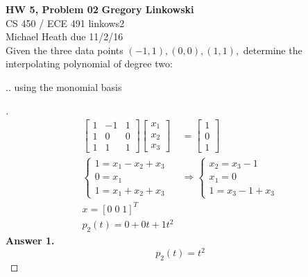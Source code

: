 \documentclass[12pt]{article}
\newenvironment{exercise}[2][Exercise]{\begin{trivlist}
\item[\hskip \labelsep {\bfseries #1}\hskip \labelsep {\bfseries #2.}]}{\end{trivlist}}
\begin{document}
\noindent
\large\textbf{HW 5, Problem 02} \hfill \textbf{Gregory Linkowski} \\
\normalsize CS 450 / ECE 491 \hfill linkows2 \\
Michael Heath \hfill due 11/2/16 \\


\vspace{5mm}
Given the three data points $(-1,1), (0,0), (1,1),$ determine the interpolating polynomial of degree two:
\vspace{-2mm} \\

\begin{exercise}{1}
	... using the monomial basis
\end{exercise} \vspace{-10mm}
\begin{proof}[]
	\begin{align*}
		\begin{bmatrix}	1 & -1 & 1 \\ 1 & 0 & 0 \\ 1 & 1 & 1	\end{bmatrix}
			\begin{bmatrix}	x_1 \\ x_2 \\ x_3 \end{bmatrix}
			&= \begin{bmatrix} 1 \\ 0 \\ 1	\end{bmatrix} \\[10pt]
		\begin{cases}
			1 = x_1 - x_2 + x_3 \\
			0 = x_1 \\
			1 = x_1 + x_2 + x_3
		\end{cases}
			& \Rightarrow \begin{cases}
				x_2 = x_3 - 1 \\
				x_1 = 0 \\
				1 = x_3 - 1 + x_3
			\end{cases} \\[10pt]
		x = [0 \; 0 \; 1]^T \\
		p_{2}(t) = 0 + 0t + 1t^2 
	\end{align*}
	\textbf{Answer 1.} \vspace{-7mm} \\
		\[ \boxed{p_{2}(t) = t^2} \]
\end{proof}
\end{document}
